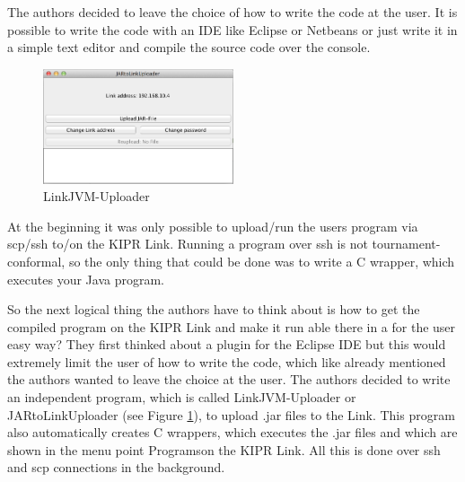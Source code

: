 \documentclass{juniorjournal}
\begin{document}
The authors decided to leave the choice of how to write the code at the user. It 
is possible to write the code with an IDE like Eclipse or Netbeans or just write 
it in a simple text editor and compile the source code over the console.

\begin{figure}[H]
\centering
\includegraphics[width=0.5\textwidth]{images/linkjvm_uploader.jpg}
\caption{LinkJVM-Uploader}
\label{fig:linkjvm_uploader}
\end{figure}

At the beginning it was only possible to upload/run the users program via scp/ssh to/on the KIPR\cite{KIPR} Link\cite{link}.
Running a program over ssh is not tournament-conformal, so the only thing that could be done 
was to write a C wrapper, which executes your Java\cite{Java} program.

So the next logical thing the authors have to think about is how to get the compiled 
program on the KIPR\cite{KIPR} Link\cite{link} and make it run able there in a for the user easy way?
They first thinked about a plugin for the Eclipse IDE but this would extremely 
limit the user of how to write the code, which like already mentioned the 
authors wanted to leave the choice at the user.
The authors decided to write an independent program, which is called 
LinkJVM-Uploader or JARtoLinkUploader (see Figure \ref{fig:linkjvm_uploader}), 
to upload .jar files to the Link\cite{link}. This program also automatically creates C 
wrappers, which executes the .jar files and which are shown in the menu point 
\frqq Programs\flqq  on the KIPR\cite{KIPR} Link\cite{link}. All this is done over ssh and scp connections in 
the background.
\end{document}
